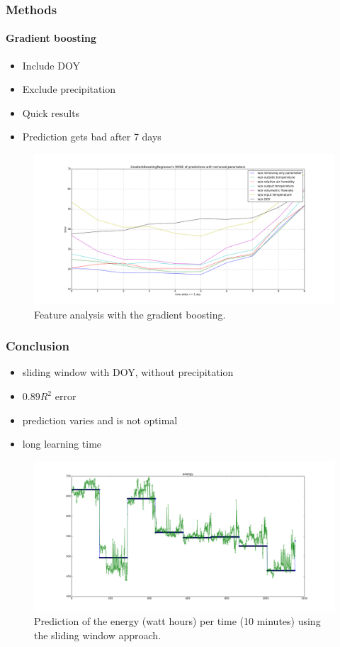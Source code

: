 \documentclass{beamer}
\begin{document}
\begin{frame}
\frametitle{Methods}
\framesubtitle{Gradient boosting}

\begin{itemize}
\item Include DOY
\item Exclude precipitation
\item Quick results
\item Prediction gets bad after 7 days 
\end{itemize}


\begin{figure}[H]
  \includegraphics[width=0.8 \linewidth]{img/GradientBoostingRegressor_day_error_without_some_params.png}
  \caption{Feature analysis with the gradient boosting.}
  \label{fig:gradientboost}
\end{figure}

\end{frame}

\begin{frame}
\frametitle{Conclusion}


\begin{itemize}
\item sliding window with DOY, without precipitation
\item $0.89 R^{2}$ error
\item prediction varies and is not optimal
\item long learning time
\end{itemize}

\begin{figure}[H]
  \includegraphics[width=0.8\linewidth]{img/predict-energy--0p890.png}
  \caption{Prediction of the energy (watt hours) per time (10 minutes) using the sliding window approach.}
  \label{fig:Prediction}
\end{figure}

\end{frame}
\end{document}

